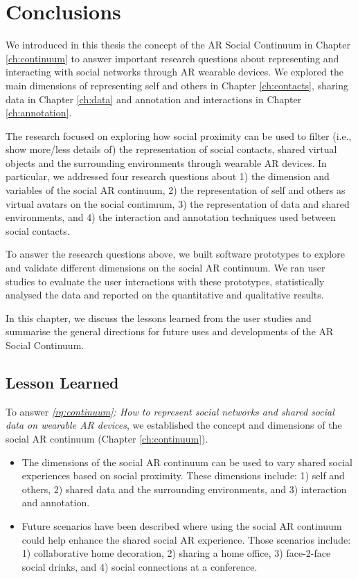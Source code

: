 \chapter{Conclusions}
\label{ch:conclusions}

We introduced in this thesis the concept of the AR Social Continuum in Chapter \ref{ch:continuum} to answer important research questions about representing and interacting with social networks through AR wearable devices. We explored the main dimensions of representing self and others in Chapter \ref{ch:contacts}, sharing data in Chapter \ref{ch:data} and annotation and interactions in Chapter \ref{ch:annotation}. 

The research focused on exploring how social proximity can be used to filter (i.e., show more/less details of) the representation of social contacts, shared virtual objects and the surrounding environments through wearable AR devices. In particular, we addressed four research questions about 1) the dimension and variables of the social AR continuum, 2) the representation of self and others as virtual avatars on the social continuum, 3) the representation of data and shared environments, and 4) the interaction and annotation techniques used between social contacts.   

To answer the research questions above, we built software prototypes to explore and validate different dimensions on the social AR continuum. We ran user studies to evaluate the user interactions with these prototypes, statistically analysed the data and reported on the quantitative and qualitative results. 

In this chapter, we discuss the lessons learned from the user studies and summarise the general directions for future uses and developments of the AR Social Continuum. 

\pagebreak

\section{Lesson Learned}
To answer \textit{\ref{rq:continuum}: How to represent social networks and shared social data on wearable AR devices}, we established the concept and dimensions of the social AR continuum (Chapter \ref{ch:continuum}).

\begin{itemize}
    \item{The dimensions of the social AR continuum can be used to vary shared social experiences based on social proximity. These dimensions include: 1) self and others, 2) shared data and the surrounding environments, and 3) interaction and annotation.}
    \item{Future scenarios have been described where using the social AR continuum could help enhance the shared social AR experience. Those scenarios include: 1) collaborative home decoration, 2) sharing a home office, 3) face-2-face social drinks, and 4) social connections at a conference.}
\end{itemize}

